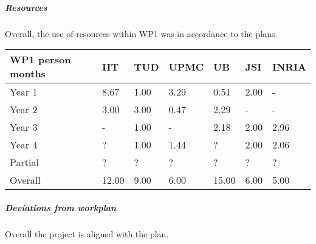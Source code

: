 

\subparagraph*{Resources}
Overall, the use of resources within WP1 was in accordance to the plans. 

\begin{center}
  \begin{tabular}{|C{1.5cm}|C{1.5cm}|C{1.5cm}|C{2cm}|C{2cm}|C{2cm}|C{2cm}|}
    \hline \footnotesize \textbf{WP1 person months}& \footnotesize
    \textbf{IIT}&\footnotesize \textbf{TUD}&\footnotesize \textbf{UPMC}&
    \footnotesize \textbf{UB} &\footnotesize \textbf{JSI} & \footnotesize \textbf{INRIA}\\
    \hline \footnotesize Year 1  & 8.67  & 1.00 & 3.29 & 0.51 & 2.00 & -\\
    \hline \footnotesize Year 2  & 3.00  & 3.00 & 0.47 & 2.29 & -    & - \\
    \hline \footnotesize Year 3  & -     & 1.00 & -    & 2.18 & 2.00 & 2.96 \\
    \hline \footnotesize Year 4  & ?     & 1.00 & 1.44 & ?    & 2.00 & 2.06 \\
   	\hline \footnotesize Partial & ?     & ?    & ?    & ?    & ?    & ?    \\
	\hline
    \hline \footnotesize Overall & 12.00 & 9.00 & 6.00 & 15.00 & 6.00 & 5.00 \\
    \hline
  \end{tabular}
\end{center}

\subparagraph*{Deviations from workplan} 
Overall the project is aligned with the plan.
